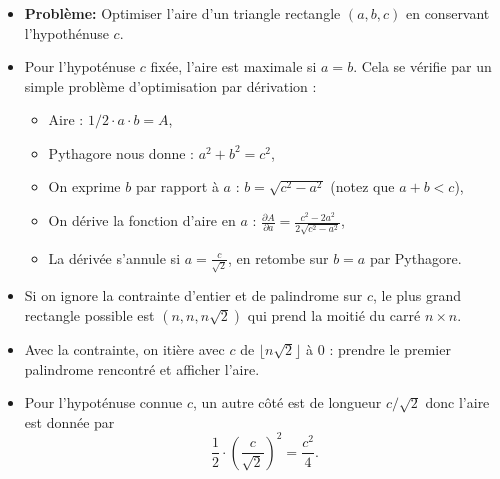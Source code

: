 \begin{frame}
    \frametitle{\problemtitle}
    \begin{itemize}
        \item<+-> \textbf{Problème:} Optimiser l'aire d'un triangle rectangle $(a,b,c)$ en conservant l'hypothénuse $c$.
        \item<+-> Pour l'hypoténuse $c$ fixée, l'aire est maximale si $a=b$. Cela se vérifie par un simple problème d'optimisation par dérivation :
        \begin{itemize}
            \item Aire : $1/2 \cdot a\cdot b = A$,
            \item Pythagore nous donne : $a^2 + b^2 = c^2$,
            \item On exprime $b$ par rapport à $a$ : $b = \sqrt{c^2 - a^2}$ (notez que $a+b<c$),
            \item On dérive la fonction d'aire en $a$ : $\frac{\partial A}{\partial a} = \frac{c^2-2a^2}{2\sqrt{c^2-a^2}}$,
            \item La dérivée s'annule si $a=\frac{c}{\sqrt{2}}$, en retombe sur $b=a$ par Pythagore.
        \end{itemize}
        \item<+-> Si on ignore la contrainte d'entier et de palindrome sur $c$, le plus grand rectangle possible est $(n,n,n\sqrt{2})$ qui prend la moitié du carré $n\times n$.
        \item<+-> Avec la contrainte, on itière avec $c$ de $\lfloor n\sqrt{2} \rfloor$ à $0$ : prendre le premier palindrome rencontré et afficher l'aire.
        \item<+-> Pour l'hypoténuse connue $c$, un autre côté est de longueur $c/\sqrt{2}$ donc l'aire est donnée par \[\frac{1}{2}\cdot\left(\frac{c}{\sqrt{2}}\right)^2 = \frac{c^2}{4}.\]

    \end{itemize}
\end{frame}
